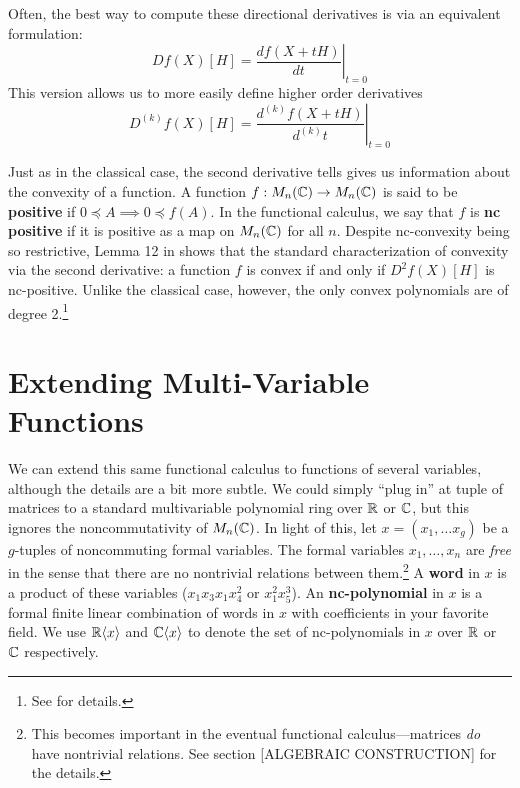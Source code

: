 Often, the best way to compute these directional derivatives is via an
equivalent formulation:
\[
    Df(X)[H] = \left.\frac{df(X+tH)}{dt}\right|_{t=0}
\]
This version allows us to more easily define higher order derivatives
\[
    D^{(k)}f(X)[H] = \left.\frac{d^{(k)}f(X+tH)}{d^{(k)}t}\right|_{t=0}
\]

Just as in the classical case, the second derivative tells gives us information
about the convexity of a function. A function \(f:M_n(\mathbb{C})\to M_n(\mathbb{C})\) is said
to be \textbf{positive} if \(0\preceq A \implies 0\preceq f(A)\). In the
functional calculus, we say that \(f\) is \textbf{nc positive} if it is positive
as a map on \(M_n(\mathbb{C})\) for all \(n\).
Despite nc-convexity being so restrictive, Lemma 12 in \cite{heltonFree2013}
shows that the standard characterization of convexity via the second
derivative: a function \(f\) is convex if and only if \(D^{2}f(X)[H]\) is
nc-positive. Unlike the classical case, however, the only convex polynomials are
of degree 2.\footnote{See \cite{heltonFree2013} for details.}

\section{Extending Multi-Variable Functions}%
\label{sec:ExtMuliVarFun}

We can extend this same functional calculus to functions of several variables,
although the details are a bit more subtle. We could simply ``plug in'' at tuple
of matrices to a standard multivariable polynomial ring over \(\mathbb{R} \) or
\(\mathbb{C} \), but this ignores the noncommutativity of \(M_n(\mathbb{C})\). In light of this,
let \(x = (x_1 , \dots x_g)\) be a
\(g\)-tuples of noncommuting formal variables. The formal variables
\(x_1, \dots , x_n\) are \emph{free} in the sense that there are no nontrivial
relations between them.\footnote{This becomes important in the eventual
  functional calculus---matrices \emph{do} have nontrivial relations. See
  section [ALGEBRAIC CONSTRUCTION] for the details.}
A \textbf{word} in \(x\) is a product of these
variables (\eg \(x_1x_3x_1x_4^2\) or \(x_1^2x_5^3\)). An \textbf{nc-polynomial}
in \(x\) is a formal finite linear combination of words in \(x\) with
coefficients in your favorite field. We use \(\mathbb{R} \langle x \rangle\) and
\(\mathbb{C} \langle x \rangle\) to denote the set of nc-polynomials in \(x\) over
\(\mathbb{R} \) or \(\mathbb{C} \) respectively.

